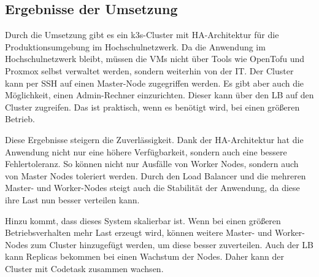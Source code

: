 \subsection{Ergebnisse der Umsetzung}
Durch die Umsetzung gibt es ein k3s-Cluster mit HA-Architektur für die Produktionsumgebung im Hochschulnetzwerk. 
Da die Anwendung im Hochschulnetzwerk bleibt, müssen die VMs nicht über Tools wie OpenTofu und Proxmox selbst verwaltet werden, sondern weiterhin von der IT.
Der Cluster kann per SSH auf einen Master-Node zugegriffen werden. Es gibt aber auch die Möglichkeit, einen Admin-Rechner einzurichten. Dieser kann über den LB auf den Cluster zugreifen. 
Das ist praktisch, wenn es benötigt wird, bei einen größeren Betrieb.

Diese Ergebnisse steigern die Zuverlässigkeit. 
Dank der HA-Architektur hat die Anwendung nicht nur eine höhere Verfügbarkeit, sondern auch eine bessere Fehlertoleranz. So können nicht nur Ausfälle von Worker Nodes, sondern auch von Master Nodes toleriert werden.
Durch den Load Balancer und die mehreren Master- und Worker-Nodes steigt auch die Stabilität der Anwendung, da diese ihre Last nun besser verteilen kann.

Hinzu kommt, dass dieses System skalierbar ist. Wenn bei einen größeren Betriebsverhalten mehr Last erzeugt wird, können weitere Master- und Worker-Nodes zum Cluster hinzugefügt werden, um diese besser zuverteilen.
Auch der LB kann Replicas bekommen bei einen Wachstum der Nodes. Daher kann der Cluster mit Codetask zusammen wachsen.

